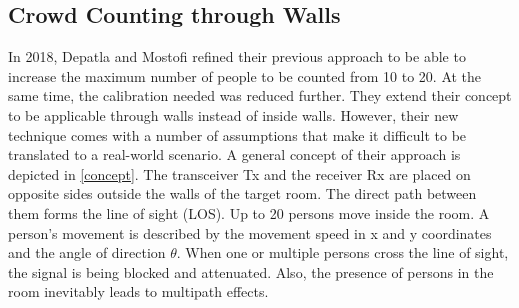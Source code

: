 \documentclass[conference]{IEEEtran}
\begin{document}
\subsection{Crowd Counting through Walls}
In 2018, Depatla and Mostofi \cite{DepatlaMostofi2018} refined their previous approach to be able to increase the maximum number of people to be counted from 10 to 20. At the same time, the calibration needed was reduced further. They extend their concept to be applicable through walls instead of inside walls. However, their new technique comes with a number of assumptions that make it difficult to be translated to a real-world scenario. A general concept of their approach is depicted in \ref{concept}. The transceiver Tx and the receiver Rx are placed on opposite sides outside the walls of the target room. The direct path between them forms the line of sight (LOS). Up to 20 persons move inside the room. A person's movement is described by the movement speed in x and y coordinates and the angle of direction $\theta$. When one or multiple persons cross the line of sight, the signal is being blocked and attenuated. Also, the presence of persons in the room inevitably leads to multipath effects.
\end{document}
